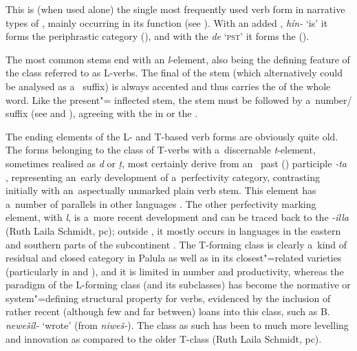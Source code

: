  This is (when used alone) the single most frequently used verb form in
narrative types of , mainly occurring in its  function (see ). With an added , \textit{hín-} `is' it forms the periphrastic category  (), and with the  \textit{de} `\textsc{pst}' it forms the  ().


The most common  stems end with an \textit{l}-element,
also being the defining feature of the class referred to as L-verbs. The final  of the stem
(which alternatively could be analysed as a~ suffix) is always accented and thus carries
the  of the whole word. Like the present"= inflected stem, the  stem must be
followed by a~number/ suffix (see  and ), agreeing with
the in  or the  .



The ending elements of the L- and T-based  verb forms are obviously quite old. The  forms belonging to the class of T-verbs with a~discernable \textit{t}-element, sometimes realised as \textit{d} or \textit{ṭ}, most certainly derive from an~ past () participle \textit{-ta} \citep[952]{whitney1960}, representing an~early development of a~perfectivity category, contrasting initially with an~aspectually unmarked plain verb stem. This element has a~number of parallels in other  languages \citep[269, 272]{masica1991}. The other perfectivity marking element, with \textit{l}, is a~more recent development and can be traced back to the  \textit{-illa} (Ruth Laila Schmidt, pc); outside , it mostly occurs in  languages in the eastern and southern parts of the subcontinent \citep[270]{masica1991}. The T-forming class is clearly a~kind of residual and closed category in Palula as well as in its closest"=related varieties (particularly in  and ), and it is limited in number and productivity, whereas the paradigm of the L-forming class (and its subclasses) has become the normative or system"=defining structural property \citep[104]{mcmahon1994} for verbs, evidenced by the inclusion of rather recent (although few and far between) loans into this class, such as B. \textit{newešíl-} `wrote' (from  \textit{niweš-}). The class as such has been  to much more levelling and innovation as compared to the older T-class (Ruth Laila Schmidt, pc).


